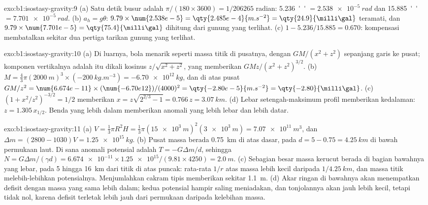 \begin{solution}{exo:b1:isostasy-gravity:9}
(a) Satu detik busur adalah $\pi/(180\times3600) = 1/\num{206265}$ radian:
\qty{5.236}{''} $= \qty{2.538e-5}{rad}$ dan \qty{15.885}{''} $=
\qty{7.701e-5}{rad}$. (b) $a_h = g\theta$: $9.79\times\num{2.538e-5} =
\qty{2.485e-4}{m.s^{-2}} = \qty{24.9}{\milli\gal}$ teramati, dan
$9.79\times\num{7.701e-5} = \qty{75.4}{\milli\gal}$ dihitung dari gunung yang terlihat.
(c) $1 - 5.236/15.885 = 0.670$: kompensasi membatalkan sekitar dua pertiga
tarikan gunung yang terlihat.
\end{solution}

\begin{solution}{exo:b1:isostasy-gravity:10}
(a) Di luarnya, bola menarik seperti massa titik di pusatnya, dengan
$GM/(x^2 + z^2)$ sepanjang garis ke pusat; komponen vertikalnya adalah itu dikali kosinus
$z/\sqrt{x^2 + z^2}$, yang memberikan $GMz/(x^2 + z^2)^{3/2}$.
(b) $M = \tfrac43\pi(\qty{2000}{m})^3\times(\qty{-200}{kg.m^{-3}}) =
\qty{-6.70e12}{kg}$, dan di atas pusat $GM/z^2 = \num{6.674e-11}\times
(\num{-6.70e12})/(4000)^2 = \qty{-2.80e-5}{m.s^{-2}} = \qty{-2.80}{\milli\gal}$.
(c) $(1 + x^2/z^2)^{-3/2} = 1/2$ memberikan $x = z\sqrt{2^{2/3} - 1} = 0.766\,z =
\qty{3.07}{km}$. (d) Lebar setengah-maksimum profil memberikan kedalaman:
$z = 1.305\,x_{1/2}$. Benda yang lebih dalam memberikan anomali yang lebih lebar dan lebih datar.
\end{solution}

\begin{solution}{exo:b1:isostasy-gravity:11}
(a) $V = \tfrac13\pi R^2 H = \tfrac13\pi(\qty{15e3}{m})^2(\qty{3e3}{m}) =
\qty{7.07e11}{m^3}$, dan $\Delta m = (2800 - 1030)V = \qty{1.25e15}{kg}$.
(b) Pusat massa berada \qty{0.75}{km} di atas dasar, pada
$d = 5 - 0.75 = \qty{4.25}{km}$ di bawah permukaan laut. Di sana anomali potensial
adalah $T = -G\Delta m/d$, sehingga $N = G\Delta m/(\gamma d) =
\num{6.674e-11}\times\num{1.25e15}/(9.81\times4250) = \qty{2.0}{m}$.
(c) Sebagian besar massa kerucut berada di bagian bawahnya yang lebar, pada 5 hingga
\qty{16}{km} dari titik di atas puncak: rata-rata $1/r$ atas massa lebih kecil daripada
$1/\qty{4.25}{km}$, dan massa titik melebih-lebihkan potensialnya. Menjumlahkan
cakram tipis memberikan sekitar \qty{1.1}{m}.
(d) Akar  ringan di bawahnya akan menempatkan defisit dengan massa yang sama
lebih dalam; kedua potensial hampir saling meniadakan, dan tonjolannya akan jauh lebih kecil,
tetapi tidak nol, karena defisit terletak lebih jauh dari permukaan daripada kelebihan massa.
\end{solution}

